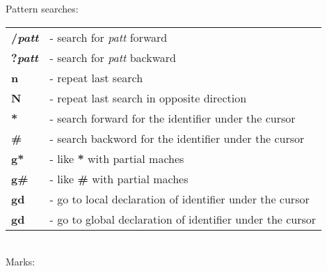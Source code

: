 \documentclass[a4paper,8pt]{extarticle}
\begin{document}
\begin{multicols*}{4}
		\noindent
		Pattern searches:\\
		\begin{tabular}{ l l }
			\textbf{/\textsl{patt}}	&	- search for \textsl{patt} forward						\\
			\textbf{?\textsl{patt}}	&	- search for \textsl{patt} backward					\\
			\textbf{n}			&	- repeat last search 								\\
			\textbf{N}			&	- repeat last search in opposite direction 				\\
			\textbf{*}			&	- search forward for the identifier under the cursor		\\
			\textbf{\#}			&	- search backword for the identifier under the cursor		\\
			\textbf{g*}			&	- like \textbf{*} with partial maches					\\
			\textbf{g\#}			&	- like \textbf{\#} with partial maches					\\
			\textbf{gd}			&	- go to local declaration of identifier under the cursor	\\
			\textbf{gd}			&	- go to global declaration of identifier under the cursor	\\
		\end{tabular}\\

		\noindent
		Marks:

	\end{multicols*}
\end{document}
